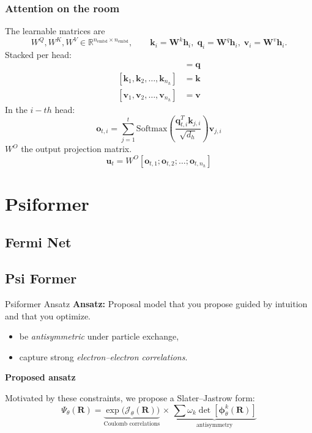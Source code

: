 \documentclass{beamer}
\begin{document}
\begin{frame}
\frametitle{Attention on the room}
The learnable matrices are
\begin{equation*}
W^{Q}, W^{K}, W^{V} \in \mathbb{R}^{n_{\text{embd}}\times n_{\text{embd}}},\qquad
\mathbf{k}_{i}=\mathbf{W}^{k}\mathbf{h}_{i},\;
\mathbf{q}_{i}=\mathbf{W}^{q}\mathbf{h}_{i},\;
\mathbf{v}_{i}=\mathbf{W}^{v}\mathbf{h}_{i}.
\end{equation*}
Stacked per head:
\begin{align}
[\mathbf{q}_{1},\mathbf{q}_{2},\dots ,\mathbf{q}_{n_{h}}] &= \mathbf{q} \\
[\mathbf{k}_{1},\mathbf{k}_{2},\dots ,\mathbf{k}_{n_{h}}] &= \mathbf{k} \\
[\mathbf{v}_{1},\mathbf{v}_{2},\dots ,\mathbf{v}_{n_{h}}] &= \mathbf{v}
\end{align}
In the $i-th$ head:
\begin{equation}
\mathbf{o}_{t,i}=\sum_{j=1}^{t}\text{Softmax}\left( \frac{\mathbf{q}^{T}_{t,i}\mathbf{k}_{j,i}}{\sqrt{ d_{h} }} \right) \mathbf{v}_{j,i}
\end{equation}
$W^{O}$ the output projection matrix.
$$\mathbf{u}_{t}=W^{O}[\mathbf{o}_{t,1};\mathbf{o}_{t,2};\dots ;\mathbf{o}_{t,n_{h}}]$$
\end{frame}

\section{Psiformer}
\subsection{Fermi Net}
\subsection{Psi Former}

\begin{frame}{Psiformer Ansatz}
\textbf{Ansatz:} Proposal model that you propose guided by intuition and that you optimize.
\begin{itemize}
    \item be \emph{antisymmetric} under particle exchange,
    \item capture strong \emph{electron--electron correlations}.
\end{itemize}


\textbf{Proposed ansatz}

Motivated by these constraints, we propose a Slater--Jastrow form:
\[
\Psi_{\theta}(\mathbf{R}) =
\underbrace{\exp\bigl(\mathcal{J}_{\theta}(\mathbf{R})\bigr)}_{\text{Coulomb correlations}}
\,\times\,
\underbrace{\sum \omega_k  \det[ \boldsymbol{\phi}_{\theta}^{k}(\mathbf{R})]}_{\text{antisymmetry}}
\]
\end{frame}
\end{document}
